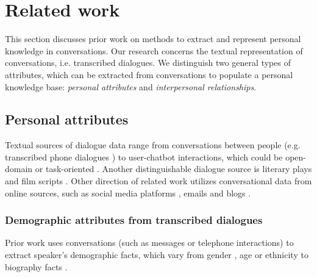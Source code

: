 \section{Related work}
\label{back_rel}

This section discusses prior work on methods to extract and represent personal knowledge in conversations. Our research concerns the textual representation of conversations, i.e. transcribed dialogues. We distinguish two general types of attributes, which can be extracted from conversations to populate a personal knowledge base: \textit{personal attributes} and \textit{interpersonal relationships}.

\subsection{Personal attributes}

Textual sources of dialogue data range from conversations between people (e.g. transcribed phone dialogues \cite{katerenchuk2014your, garera-yarowsky:2009:ACLIJCNLP}) to user-chatbot interactions, which could be open-domain \cite{li2016persona, zhang2018personalizing} or task-oriented \cite{pers2, luo2019learning, qian2019domain}. Another distinguishable dialogue source is literary plays and film scripts \cite{AIIDElin11, nalisnick2013character, jia2020ddrel}. Other direction of related work utilizes conversational data from online sources, such as social media platforms \cite{sap:EMNLP14, pietro:ACL15, pennacchiotti2011machine}, emails \cite{garera-yarowsky:2009:ACLIJCNLP} and blogs \cite{sap:EMNLP14}.

\subsubsection{Demographic attributes from transcribed dialogues}

Prior work uses conversations (such as messages or telephone interactions) to extract speaker's demographic facts, which vary from gender \cite{welch2019look, dial7, garera-yarowsky:2009:ACLIJCNLP}, age \cite{welch2019look, garera-yarowsky:2009:ACLIJCNLP} or ethnicity \cite{garera-yarowsky:2009:ACLIJCNLP, dial7} to biography facts \cite{jing-kambhatla-roukos:2007:ACLMain}.

